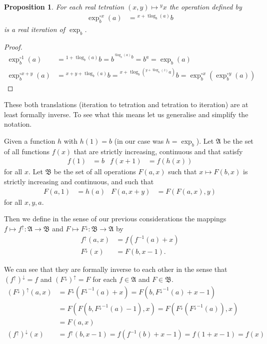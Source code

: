 \documentclass[12pt]{article}
\newtheorem{proposition}{Proposition}
\theoremstyle{definition}
\newcommand{\tet}[2]{{{}^{#2}{#1}}}
\newcommand{\tlog}[2]{\tlogs_{#1}(#2)}
\DeclareMathOperator{\tlogs}{tlog}
\begin{document}
\begin{proposition}
  For each real tetration $(x,y)\mapsto \tet{x}{y}$ the operation defined by
  \begin{align*}
    \exp_b^{\circ x}(a)&=\tet{b}{x+ \tlog{b}{a}}
  \end{align*}
  is a real iteration of $\exp_b$.
\end{proposition}
\begin{proof}
  \begin{align*}
    \exp_b^{\circ 1}(a) &= \tet{b}{1+ \tlog{b}{a}}
    = b^{\tet{b}{\tlog{b}{a}}}
    = b^a = \exp_b(a)\\
    \exp_b^{\circ x+y}(a) &= \tet{b}{x+y+ \tlog{b}{a}}
    = \tet{b}{x+ \tlog{b}{\tet{a}{y+ \tlog{b}{z}}}} 
    = \exp_b^{\circ x}(\exp_b^{\circ y}(a))
  \end{align*}
\end{proof}

These both translations (iteration to tetration and tetration to
iteration) are at least formally inverse. To see what this means 
let us generalise and simplify the notation.

Given a function $h$ with $h(1)=b$ (in
our case was $h=\exp_b$). Let $\mathfrak{A}$ be the set of all functions
$f(x)$ that are strictly increasing, continuous and that satisfy 
\begin{align*}
  f(1)&=b & f(x+1)&=f(h(x))
\end{align*}
for all $x$. Let $\mathfrak{B}$ be the set of
all operations $F(a,x)$ such that $x\mapsto F(b,x)$ is strictly
increasing and continuous, and such that
\begin{align*}
  F(a,1)&=h(a) & F(a,x+y)&=F(F(a,x),y)
\end{align*}
for all $x,y,a$.

Then we define in the sense of our previous considerations
the mappings $f\mapsto f^\uparrow\colon\mathfrak{A}\to\mathfrak{B}$
and $F\mapsto F^\downarrow\colon \mathfrak{B}\to\mathfrak{A}$ by 
\begin{align}
  f^\uparrow(a,x)&=f(f^{-1}(a)+x)\label{uparrow}\\
  F^\downarrow(x)&=F(b,x-1)\label{downarrow}.
\end{align}

We can see that they are formally inverse to each other in the
sense that $(f^{\uparrow})^\downarrow=f$ and
$(F^{\downarrow})^\uparrow=F$ for each $f\in\mathfrak{A}$ and
$F\in\mathfrak{B}$.
\begin{align*}
  (F^\downarrow)^\uparrow(a,x)
  &=F^\downarrow({F^\downarrow}^{-1}(a)+x)
  =F(b,{F^\downarrow}^{-1}(a)+x-1)\\
  &=F(F(b,{F^\downarrow}^{-1}(a)-1),x)
  =F(F^\downarrow({F^\downarrow}^{-1}(a)),x)\\
  &=F(a,x)\\
  (f^\uparrow)^\downarrow(x)
  &=f^\uparrow(b,x-1)
  =f(f^{-1}(b)+x-1)=f(1+x-1)=f(x)
\end{align*}
\end{document}
